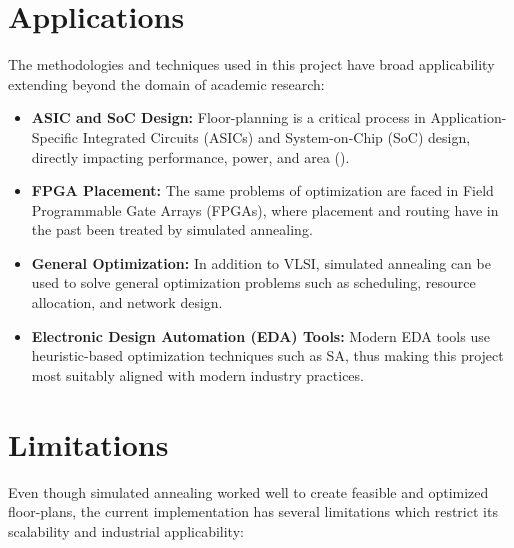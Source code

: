\documentclass[9pt,a4paper,twoside]{rho-class/rho}
\begin{document}
\section{Applications}
The methodologies and techniques used in this project have broad applicability extending beyond the domain of academic research: 
\begin{itemize}
    \item \textbf{ASIC and SoC Design:} Floor-planning is a critical process in Application-Specific Integrated Circuits (ASICs) and System-on-Chip (SoC) design, directly impacting performance, power, and area  (\cite{parsac2024}).
    \item \textbf{FPGA Placement:} The same problems of optimization are faced in Field Programmable Gate Arrays (FPGAs), where placement and routing have in the past been treated by simulated annealing. 
    \item \textbf{General Optimization:} In addition to VLSI, simulated annealing can be used to solve general optimization problems such as scheduling, resource allocation, and network design. 
    \item \textbf{Electronic Design Automation (EDA) Tools:} Modern EDA tools use heuristic-based optimization techniques such as SA, thus making this project most suitably aligned with modern industry practices. 
\end{itemize}

\section{Limitations}
Even though simulated annealing worked well to create feasible and optimized floor-plans, the current implementation has several limitations which restrict its scalability and industrial applicability: 
\end{document}
